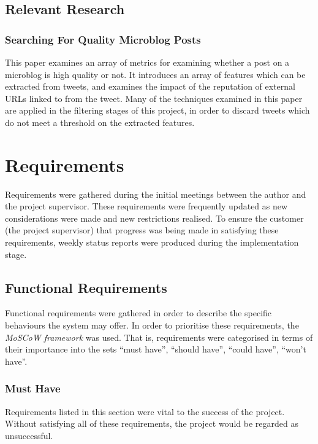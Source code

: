 \documentclass{l4proj}
\begin{document}
\section{Relevant Research}


    \subsection{Searching For Quality Microblog Posts}
    This paper examines an array of metrics for examining whether a post on a microblog is high quality or not. It introduces an array of features which can be extracted from tweets, and examines the impact of the reputation of external URLs linked to from the tweet. Many of the techniques examined in this paper are applied in the filtering stages of this project, in order to discard tweets which do not meet a threshold on the extracted features.

\chapter{Requirements}

Requirements were gathered during the initial meetings between the author and the project supervisor. These requirements were frequently updated as new considerations were made and new restrictions realised. To ensure the customer (the project supervisor) that progress was being made in satisfying these requirements, weekly status reports were produced during the implementation stage. 

    \section{Functional Requirements}
    
    Functional requirements were gathered in order to describe the specific behaviours the system may offer. In order to prioritise these requirements, the \textit{MoSCoW framework} was used. That is, requirements were categorised in terms of their importance into the sets ``must have'', ``should have'', ``could have'', ``won't have''.
    
    \subsection{Must Have}
    
    Requirements listed in this section were vital to the success of the project. Without satisfying all of these requirements, the project would be regarded as unsuccessful. 
  
\end{document}
